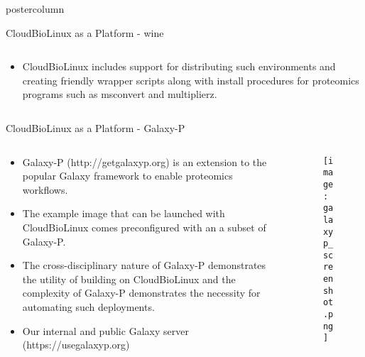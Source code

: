 \documentclass[final]{beamer}
\begin{document}
\begin{frame}
\begin{columns}
\begin{column}{.5\textwidth}
\begin{beamercolorbox}[center,wd=\textwidth]{postercolumn}
\begin{minipage}[T]{.95\textwidth}
{\begin{block}{CloudBioLinux as a Platform - wine}
\begin{columns}
\begin{column}{.59\textwidth}
\begin{itemize}
            \item CloudBioLinux includes support for distributing such
            environments and creating friendly wrapper scripts along with install
            procedures for proteomics programs such as msconvert and multiplierz.

            \end{itemize}
            \end{column}
            \end{columns}
            \end{block}

            \vfill
            
            \begin{block}{CloudBioLinux as a Platform - Galaxy-P}

              \begin{columns}

                \begin{column}{.60\textwidth}
                  \begin{itemize}

                    \item  Galaxy-P (http://getgalaxyp.org) is an extension to the popular Galaxy framework to 
                    enable proteomics workflows.

                    \item The example image that can be launched with CloudBioLinux comes preconfigured with 
                    an a subset of Galaxy-P.


                    \item The cross-disciplinary nature of Galaxy-P demonstrates the utility of building on 
                    CloudBioLinux and the complexity of Galaxy-P demonstrates the necessity for automating such 
                    deployments.

                    \item Our internal and public Galaxy server (https://usegalaxyp.org)

                  \end{itemize}
                \end{column}

                \begin{column}{.35\textwidth}
                  \begin{figure}
                    \texttt{[image: galaxyp\_screenshot.png]}
                  \end{figure}
                \end{column}


\end{columns}
\end{block}}
\end{minipage}
\end{beamercolorbox}
\end{column}
\end{columns}
\end{frame}
\end{document}
